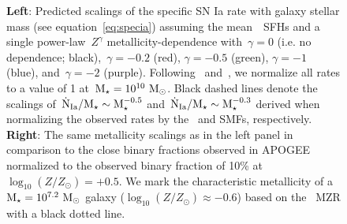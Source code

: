 \documentclass[ms.tex]{subfiles}
\begin{document}
\begin{figure}
\caption{
\textbf{Left}: Predicted scalings of the specific SN Ia rate with galaxy
stellar mass (see equation~\ref{eq:specia}) assuming the mean~\um~SFHs and a
single power-law~$Z^\gamma$ metallicity-dependence with~$\gamma = 0$ (i.e. no
dependence; black),~$\gamma = -0.2$ (red), $\gamma = -0.5$ (green),
$\gamma = -1$ (blue), and~$\gamma = -2$ (purple).
Following~\citet{Brown2019} and~\citet{Gandhi2022}, we normalize all rates to
a value of 1 at~$\text{M}_\star = 10^{10}~\text{M}_\odot$.
Black dashed lines denote the scalings of~$\dot{\text{N}}_\text{Ia} / \text{M}_\star
\sim \text{M}_\star^{-0.5}$ and~$\dot{\text{N}}_\text{Ia} / \text{M}_\star \sim \text{M}_\star^{-0.3}$
derived when normalizing the observed rates by the~\citet{Bell2003} and
\citet{Baldry2012} SMFs, respectively.
\textbf{Right}: The same metallicity scalings as in the left panel in
comparison to the close binary fractions observed in APOGEE
\citep[][black dashed line with error bars]{Moe2019} normalized to the observed
binary fraction of 10\% at~$\log_{10}(Z / Z_\odot) = +0.5$.
We mark the characteristic metallicity of a~$\text{M}_\star = 10^{7.2}~\text{M}_\odot$ galaxy
($\log_{10}(Z / Z_\odot) \approx -0.6$) based on the~\citet{Zahid2014} MZR
with a black dotted line.
}
\label{fig:specia_metdep}
\end{figure}
\end{document}
